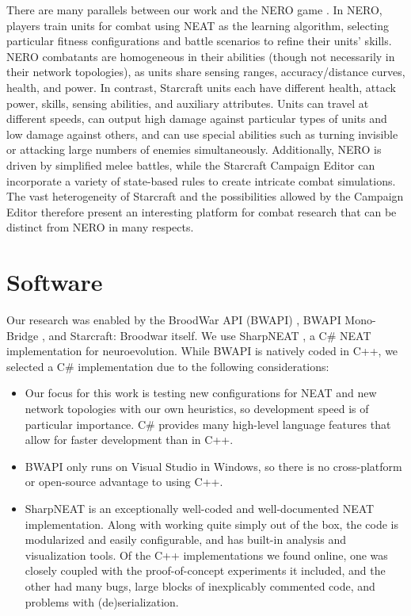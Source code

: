 \documentclass[10pt,a4paper,twocolumn]{article}
\begin{document}
There are many parallels between our work and the NERO game \cite{stanley:ieeetec05}. In NERO, players train units for combat using NEAT as the learning algorithm, selecting particular fitness configurations and battle scenarios to refine their units' skills. NERO combatants are homogeneous in their abilities (though not necessarily in their network topologies), as units share sensing ranges, accuracy/distance curves, health, and power. In contrast, Starcraft units each have different health, attack power, skills, sensing abilities, and auxiliary attributes. Units can travel at different speeds, can output high damage against particular types of units and low damage against others, and can use special abilities such as turning invisible or attacking large numbers of enemies simultaneously. Additionally, NERO is driven by simplified melee battles, while the Starcraft Campaign Editor can incorporate a variety of state-based rules to create intricate combat simulations. The vast heterogeneity of Starcraft and the possibilities allowed by the Campaign Editor therefore present an interesting platform for combat research that can be distinct from NERO in many respects.

\section{Software}
\label{sec:soft}

Our research was enabled by the BroodWar API (BWAPI) \cite{bwapi}, BWAPI Mono-Bridge \cite{monobridge}, and Starcraft: Broodwar itself. We use SharpNEAT \cite{sharpneat}, a C\# NEAT implementation for neuroevolution. While BWAPI is natively coded in C++, we selected a C\# implementation due to the following considerations:

\begin{itemize}
	\item Our focus for this work is testing new configurations for NEAT and new network topologies with our own heuristics, so development speed is of particular importance. C\# provides many high-level language features that allow for faster development than in C++.
	\item BWAPI only runs on Visual Studio in Windows, so there is no cross-platform or open-source advantage to using C++.
	\item SharpNEAT is an exceptionally well-coded and well-documented NEAT implementation. Along with working quite simply out of the box, the code is modularized and easily configurable, and has built-in analysis and visualization tools. Of the C++ implementations we found online, one was closely coupled with the proof-of-concept experiments it included, and the other had many bugs, large blocks of inexplicably commented code, and problems with (de)serialization.
\end{itemize}
\end{document}
